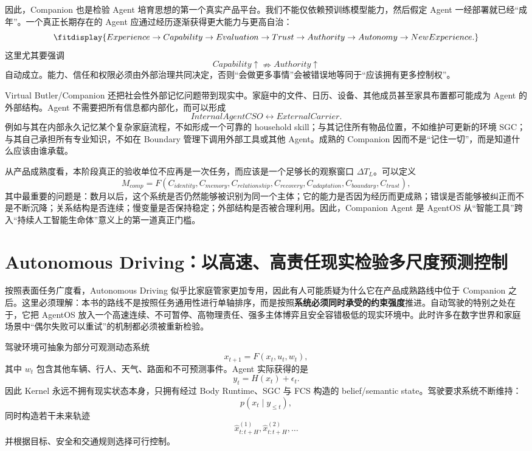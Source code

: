 因此，Companion 也是检验 Agent 培育思想的第一个真实产品平台。我们不能仅依赖预训练模型能力，然后假定 Agent 一经部署就已经“成年”。一个真正长期存在的 Agent 应通过经历逐渐获得更大能力与更高自治：
\[
\fitdisplay{
Experience
\rightarrow
Capability
\rightarrow
Evaluation
\rightarrow
Trust
\rightarrow
Authority
\rightarrow
Autonomy
\rightarrow
NewExperience.
}
\]
这里尤其要强调
\[
Capability\uparrow
\nRightarrow
Authority\uparrow
\]
自动成立。能力、信任和权限必须由外部治理共同决定，否则“会做更多事情”会被错误地等同于“应该拥有更多控制权”。

Virtual Butler/Companion 还把社会性外部记忆问题带到现实中。家庭中的文件、日历、设备、其他成员甚至家具布置都可能成为 Agent 的外部结构。Agent 不需要把所有信息都内部化，而可以形成
\[
InternalAgentCSO
\leftrightarrow
ExternalCarrier.
\]
例如与其在内部永久记忆某个复杂家庭流程，不如形成一个可靠的 household skill；与其记住所有物品位置，不如维护可更新的环境 SGC；与其自己承担所有专业知识，不如在 Boundary 管理下调用外部工具或其他 Agent。成熟的 Companion 因而不是“记住一切”，而是知道什么应该由谁承载。

从产品成熟度看，本阶段真正的验收单位不应再是一次任务，而应该是一个足够长的观察窗口 $\Delta T_L$。可以定义
\[
M_{comp}
=
F(
C_{identity},
C_{memory},
C_{relationship},
C_{recovery},
C_{adaptation},
C_{boundary},
C_{trust}
),
\]
其中最重要的问题是：数月以后，这个系统是否仍然能够被识别为同一个主体；它的能力是否因为经历而更成熟；错误是否能够被纠正而不是不断沉降；关系结构是否连续；慢变量是否保持稳定；外部结构是否被合理利用。因此，Companion Agent 是 AgentOS 从“智能工具”跨入“持续人工智能生命体”意义上的第一道真正门槛。

\section{Autonomous Driving：以高速、高责任现实检验多尺度预测控制}

按照表面任务广度看，Autonomous Driving 似乎比家庭管家更加专用，因此有人可能质疑为什么它在产品成熟路线中位于 Companion 之后。这里必须理解：本书的路线不是按照任务通用性进行单轴排序，而是按照\textbf{系统必须同时承受的约束强度}推进。自动驾驶的特别之处在于，它把 AgentOS 放入一个高速连续、不可暂停、高物理责任、强多主体博弈且安全容错极低的现实环境中。此时许多在数字世界和家庭场景中“偶尔失败可以重试”的机制都必须被重新检验。

驾驶环境可抽象为部分可观测动态系统
\[
x_{t+1}
=
F(x_t,u_t,w_t),
\]
其中 $w_t$ 包含其他车辆、行人、天气、路面和不可预测事件。Agent 实际获得的是
\[
y_t
=
H(x_t)+\epsilon_t.
\]
因此 Kernel 永远不拥有现实状态本身，只拥有经过 Body Runtime、SGC 与 FCS 构造的 belief/semantic state。驾驶要求系统不断维持：
\[
p(x_t\mid y_{\leq t}),
\]
同时构造若干未来轨迹
\[
\hat{x}_{t:t+H}^{(1)},
\hat{x}_{t:t+H}^{(2)},\ldots
\]
并根据目标、安全和交通规则选择可行控制。

